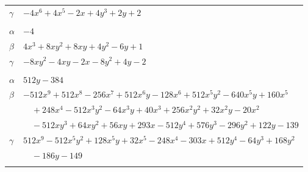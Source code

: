 \documentclass[11pt]{article}
\begin{document}
\begin{longtable}{@{}ll@{}}
$\gamma$ & $-4x^{6}+4x^{5}-2x+4y^{3}+2y+2$\\
\addlinespace[3pt]
\multicolumn{2}{@{}l}{$\{i,j\}=\{38,40\}$, $k_{ij}=3$}\\
$\alpha$ & $-4$\\
$\beta$ & $4x^{3}+8xy^{2}+8xy+4y^{2}-6y+1$\\
$\gamma$ & $-8xy^{2}-4xy-2x-8y^{2}+4y-2$\\
\addlinespace[3pt]
\multicolumn{2}{@{}l}{$\{i,j\}=\{39,40\}$, $k_{ij}=2^{5}\cdot 3$}\\
$\alpha$ & $512y-384$\\
$\beta$ & $-512x^{9}+512x^{8}-256x^{7}+512x^{6}y-128x^{6}+512x^{5}y^{2}-640x^{5}y+160x^{5}$\\
 & $\quad +248x^{4}-512x^{3}y^{2}-64x^{3}y+40x^{3}+256x^{2}y^{2}+32x^{2}y-20x^{2}$\\
 & $\quad -512xy^{3}+64xy^{2}+56xy+293x-512y^{4}+576y^{3}-296y^{2}+122y-139$\\
$\gamma$ & $512x^{9}-512x^{5}y^{2}+128x^{5}y+32x^{5}-248x^{4}-303x+512y^{4}-64y^{3}+168y^{2}$\\
 & $\quad -186y-149$\\
\addlinespace[3pt]
\end{longtable}
\endgroup
\end{document}
